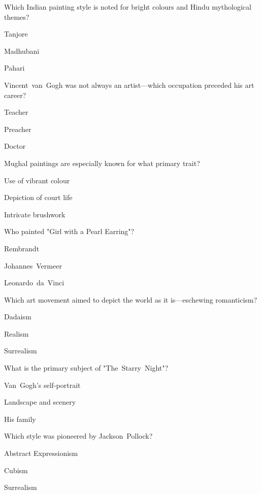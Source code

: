 \begin{enhancedmcq}{Which Indian painting style is noted for bright colours and Hindu mythological themes?}
\item Tanjore
\item Madhubani
\item Pahari

\end{enhancedmcq}
\begin{enhancedmcq}{Vincent van Gogh was not always an artist—which occupation preceded his art career?}
\item Teacher
\item Preacher
\item Doctor

\end{enhancedmcq}
\begin{enhancedmcq}{Mughal paintings are especially known for what primary trait?}
\item Use of vibrant colour
\item Depiction of court life
\item Intricate brushwork

\end{enhancedmcq}
\begin{enhancedmcq}{Who painted "Girl with a Pearl Earring"?}
\item Rembrandt
\item Johannes Vermeer
\item Leonardo da Vinci

\end{enhancedmcq}
\begin{enhancedmcq}{Which art movement aimed to depict the world as it is—eschewing romanticism?}
\item Dadaism
\item Realism
\item Surrealism

\end{enhancedmcq}
\begin{enhancedmcq}{What is the primary subject of "The Starry Night"?}
\item Van Gogh's self‑portrait
\item Landscape and scenery
\item His family

\end{enhancedmcq}
\begin{enhancedmcq}{Which style was pioneered by Jackson Pollock?}
\item Abstract Expressionism
\item Cubism
\item Surrealism

\end{enhancedmcq}

